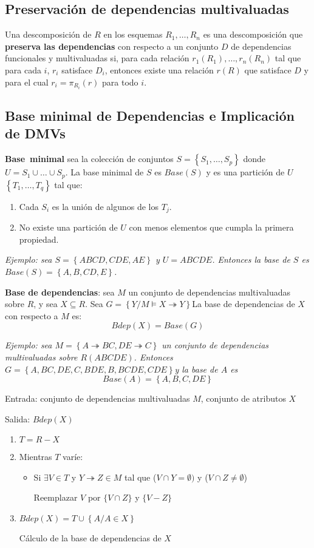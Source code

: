 \documentclass[a4paper, twoside]{article}
\begin{document}
\subsection{Preservación de dependencias multivaluadas}
Una descomposición de $R$ en los esquemas $R_{1}, \ldots, R_{n}$ es una descomposición que \textbf{preserva las dependencias} con respecto a un conjunto $D$ de dependencias funcionales y multivaluadas si, para cada relación $r_{1}(R_{1}), \ldots, r_{n}(R_{n})$ tal que para cada $i$, $r_{i}$ satisface $D_{i}$, entonces existe una relación
$r(R)$ que satisface $D$ y para el cual $r_{i} = \pi_{R_{i}}(r)$ para todo $i$.

\subsection{Base minimal de Dependencias e Implicación de DMVs}
\textbf{Base~minimal} sea la colección de conjuntos $S = \left\{ S_{1}, \ldots, S_{p} \right\}$ donde $U = S_{1} \cup \ldots \cup S_{p}$. La base minimal de $S$ es $Base(S)$ y es una partición de $U$ $\left\{ T_{1}, \ldots, T_{q}\right\}$ tal que:
\begin{enumerate}
	\item Cada $S_{i}$ es la unión de algunos de los $T_{j}$.
	\item No existe una partición de $U$ con menos elementos que cumpla la primera propiedad.
\end{enumerate}

\emph{Ejemplo: sea $S=\left\{ ABCD,CDE,AE\right\} $ y $U=ABCDE$. Entonces la base de $S$ es $Base(S)=\left\{ A,B,CD,E\right\}$.}

\textbf{Base de dependencias}: sea $M$ un conjunto de dependencias multivaluadas sobre $R$, y sea $X\subseteq R$. Sea $G=\left\{ Y/M\models X\twoheadrightarrow Y\right\} $La base de dependencias de $X$ con respecto a $M$ es:
\[
	Bdep(X)=Base\left(G\right)
\]

\emph{Ejemplo: sea $M=\left\{ A\twoheadrightarrow BC,DE\twoheadrightarrow C\right\}$ un conjunto de dependencias multivaluadas sobre $R(ABCDE)$. Entonces $G=\left\{ A,BC,DE,C,BDE,B,BCDE,CDE\right\} $y la base de $A$ es}
\[
	Base(A)=\left\{ A,B,C,DE\right\} 
\]

\begin{algorithm}[H]
	Entrada: conjunto de dependencias multivaluadas $M$, conjunto de atributos $X$

	Salida: $Bdep(X)$
	\begin{enumerate}
		\item $T=R-X$
		\item Mientras $T$ varíe:
		\begin{itemize}
			\item Si $\exists V\in T$ y $Y\twoheadrightarrow Z\in M$ tal que ($V\cap Y=\emptyset)$ y ($V\cap Z\neq\emptyset$)

			Reemplazar $V$ por $\{V\cap Z\}$ y $\{V-Z\}$
		\end{itemize}
		\item $Bdep(X)=T\cup\left\{ A/A\in X\right\} $\protect\caption{Cálculo de la base de dependencias de $X$}
	\end{enumerate}
\end{algorithm}
\end{document}
